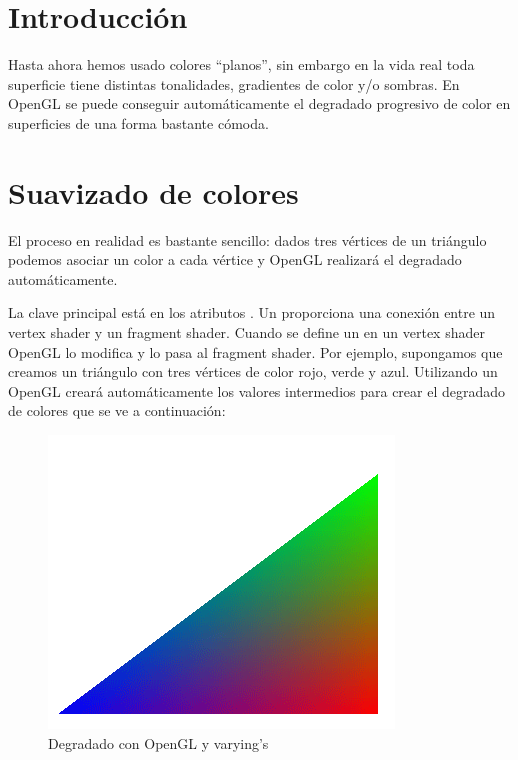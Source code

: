 \documentclass[a4paper,12pt,spanish]{sphinxmanual}
\begin{document}
\section{Introducción}
\label{cap4opengl:introduccion}
Hasta ahora hemos usado colores ``planos'', sin embargo en la vida real toda superficie tiene distintas tonalidades, gradientes de color y/o sombras. En OpenGL se puede conseguir automáticamente el degradado progresivo de color en superficies de una forma bastante cómoda.


\section{Suavizado de colores}
\label{cap4opengl:suavizado-de-colores}
El proceso en realidad es bastante sencillo: dados tres vértices de un triángulo podemos asociar un color a cada vértice y OpenGL realizará el degradado automáticamente.

La clave principal está en los atributos . Un  proporciona una conexión entre un vertex shader y un fragment shader. Cuando se define un  en un vertex shader OpenGL lo modifica y lo pasa al fragment shader. Por ejemplo, supongamos que creamos un triángulo con tres vértices de color rojo, verde y azul. Utilizando un  OpenGL creará automáticamente los valores intermedios para crear el degradado de colores que se ve a continuación:
\begin{figure}[htbp]
\centering
\capstart

\includegraphics{varying.png}
\caption{Degradado con OpenGL y varying's}\end{figure}
\end{document}
